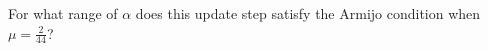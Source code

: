 For what range of $\alpha$ does this update step satisfy the Armijo condition when $\mu = \frac{2}{44}$?

\begin{solution}
    \ \\
    \vfill
\end{solution}